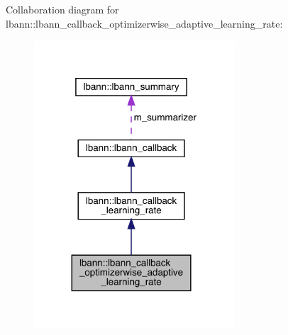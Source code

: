 Collaboration diagram for lbann\+:\+:lbann\+\_\+callback\+\_\+optimizerwise\+\_\+adaptive\+\_\+learning\+\_\+rate\+:\nopagebreak
\begin{figure}[H]
\begin{center}
\leavevmode
\includegraphics[width=212pt]{classlbann_1_1lbann__callback__optimizerwise__adaptive__learning__rate__coll__graph}
\end{center}
\end{figure}
